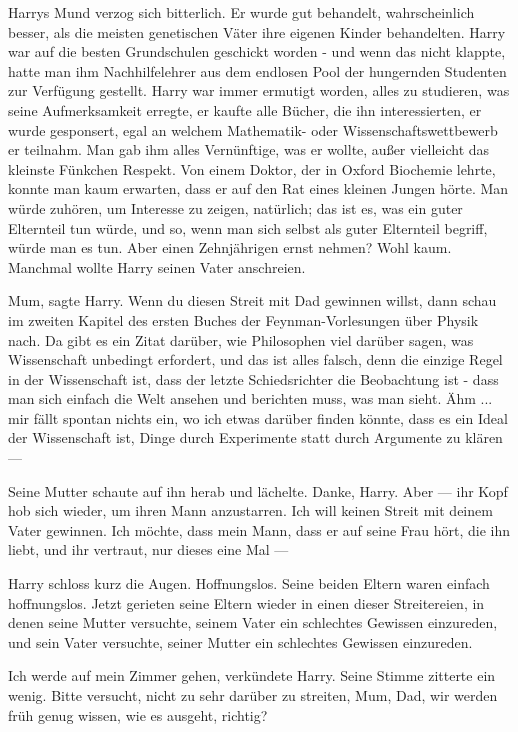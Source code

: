 Harrys Mund verzog sich bitterlich. Er wurde gut behandelt, wahrscheinlich
besser, als die meisten genetischen Väter ihre eigenen Kinder behandelten. Harry
war auf die besten Grundschulen geschickt worden - und wenn das nicht klappte,
hatte man ihm Nachhilfelehrer aus dem endlosen Pool der hungernden Studenten zur
Verfügung gestellt. Harry war immer ermutigt worden, alles zu studieren, was
seine Aufmerksamkeit erregte, er kaufte alle Bücher, die ihn interessierten, er
wurde gesponsert, egal an welchem Mathematik- oder Wissenschaftswettbewerb er
teilnahm. Man gab ihm alles Vernünftige, was er wollte, außer vielleicht das
kleinste Fünkchen Respekt. Von einem Doktor, der in Oxford Biochemie lehrte,
konnte man kaum erwarten, dass er auf den Rat eines kleinen Jungen hörte. Man
würde zuhören, um Interesse zu zeigen, natürlich; das ist es, was ein guter
Elternteil tun würde, und so, wenn man sich selbst als guter Elternteil begriff,
würde man es tun. Aber einen Zehnjährigen ernst nehmen? Wohl kaum. Manchmal
wollte Harry seinen Vater anschreien.

\glqq{}Mum\grqq{}, sagte Harry. \glqq{}Wenn du diesen Streit mit Dad gewinnen
willst, dann schau im zweiten Kapitel des ersten Buches der Feynman-Vorlesungen
über Physik nach. Da gibt es ein Zitat darüber, wie Philosophen viel darüber
sagen, was Wissenschaft unbedingt erfordert, und das ist alles falsch, denn die
einzige Regel in der Wissenschaft ist, dass der letzte Schiedsrichter die
Beobachtung ist - dass man sich einfach die Welt ansehen und berichten muss, was
man sieht. Ähm ... mir fällt spontan nichts ein, wo ich etwas darüber finden
könnte, dass es ein Ideal der Wissenschaft ist, Dinge durch Experimente statt
durch Argumente zu klären ---\grqq{}

Seine Mutter schaute auf ihn herab und lächelte. \glqq{}Danke, Harry. Aber
---\grqq{} ihr Kopf hob sich wieder, um ihren Mann anzustarren. \glqq{}Ich will
keinen Streit mit deinem Vater gewinnen. Ich möchte, dass mein Mann, dass er auf
seine Frau hört, die ihn liebt, und ihr vertraut, nur dieses eine Mal ---\grqq{}

Harry schloss kurz die Augen. Hoffnungslos. Seine beiden Eltern waren einfach
hoffnungslos. Jetzt gerieten seine Eltern wieder in einen dieser Streitereien,
in denen seine Mutter versuchte, seinem Vater ein schlechtes Gewissen
einzureden, und sein Vater versuchte, seiner Mutter ein schlechtes Gewissen
einzureden.

\glqq{}Ich werde auf mein Zimmer gehen\grqq{}, verkündete Harry. Seine Stimme
zitterte ein wenig. \glqq{}Bitte versucht, nicht zu sehr darüber zu streiten,
Mum, Dad, wir werden früh genug wissen, wie es ausgeht, richtig?\grqq{}

